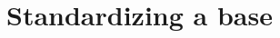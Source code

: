 \documentclass{../src/bcthesispart}
\begin{document}
%
%
%

\section{Standardizing a base}

\end{document}
